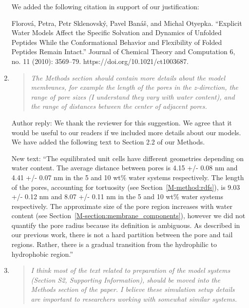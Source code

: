 \documentclass{article}
\begin{document}
\begin{enumerate}
  	We added the following citation in support of our justification:

    Florová, Petra, Petr Sklenovský, Pavel Banáš, and Michal Otyepka. “Explicit Water 
    Models Affect the Specific Solvation and Dynamics of Unfolded Peptides While the 
    Conformational Behavior and Flexibility of Folded Peptides Remain Intact.” Journal 
    of Chemical Theory and Computation 6, no. 11 (2010): 3569--79. https://doi.org/10.1021/ct1003687.

    \item \begin{quote}
    
    \textit{The Methods section should contain more details about the model membranes, for 
    example the length of the pores in the z-direction, the range of pore sizes (I understand
    they vary with water content), and the range of distances between the center of adjacent pores.}    
    
    \end{quote}
    
    Author reply: We thank the reviewer for this suggestion. We agree that it would be useful
    to our readers if we included more details about our models. We have added the following 
    text to Section 2.2 of our Methods.
    
    New text: ``The equilibrated unit cells have different geometries depending on water
    content. The average distance between pores is 4.15 +/- 0.08 nm and 4.41 +/- 0.07 nm
    in the 5 and 10 wt\% water systems respectively. The length of the pores, accounting
    for tortuosity (see Section~\ref{M-method:rdfs}), is 9.03 +/- 0.12 nm and 8.07 +/- 0.11
    nm in the 5 and 10 wt\% water systems respectively. The approximate size of the pore
    region increases with water content (see Section~\ref{M-section:membrane_components}), 
    however we did not quantify the pore radius because its definition is ambiguous. As
    described in our previous work, there is not a hard partition between the pore and tail
    regions. Rather, there is a gradual transition from the hydrophilic to hydrophobic region.''  
    
    \item \begin{quote}
    
    \textit{I think most of the text related to preparation of the model systems (Section S2, 
    Supporting Information), should be moved into the Methods section of the paper. I believe 
    these simulation setup details are important to researchers working with somewhat similar 
    systems.}
    

\end{quote}
\end{enumerate}
\end{document}
